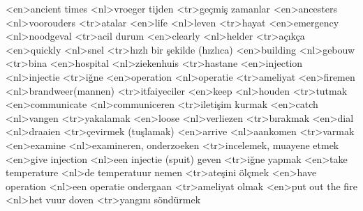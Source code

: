 <en>ancient times
<nl>vroeger tijden
<tr>geçmiş zamanlar
<en>ancesters
<nl>voorouders
<tr>atalar
<en>life
<nl>leven
<tr>hayat
<en>emergency
<nl>noodgeval
<tr>acil durum
<en>clearly
<nl>helder
<tr>açıkça
<en>quickly
<nl>snel
<tr>hızlı bir şekilde (hızlıca)
<en>building
<nl>gebouw
<tr>bina
<en>hospital
<nl>ziekenhuis
<tr>hastane
<en>injection
<nl>injectie
<tr>iğne
<en>operation
<nl>operatie
<tr>ameliyat
<en>firemen
<nl>brandweer(mannen)
<tr>itfaiyeciler
<en>keep
<nl>houden
<tr>tutmak
<en>communicate
<nl>communiceren
<tr>iletişim kurmak
<en>catch
<nl>vangen
<tr>yakalamak
<en>loose
<nl>verliezen
<tr>bırakmak
<en>dial
<nl>draaien
<tr>çevirmek (tuşlamak)
<en>arrive
<nl>aankomen
<tr>varmak
<en>examine
<nl>examineren, onderzoeken
<tr>incelemek, muayene etmek
<en>give injection
<nl>een injectie (spuit) geven
<tr>iğne yapmak
<en>take  temperature
<nl>de temperatuur nemen
<tr>ateşini ölçmek
<en>have operation
<nl>een operatie ondergaan
<tr>ameliyat olmak
<en>put out the fire
<nl>het vuur doven
<tr>yangını söndürmek
